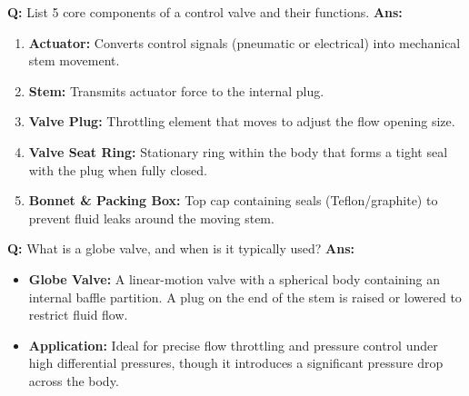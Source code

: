 \documentclass[10pt,a4paper,twocolumn]{article}
\begin{document}
\begin{tcolorbox}[
  colback=white,
  colframe=UnitColorThree,
  colbacktitle=gray!10!white,
  coltitle=black,
  fonttitle=\bfseries\sffamily\small,
  title={Unit III $\bullet$ Card 13: Control Valve Anatomy},
  boxrule=1.2pt,
  arc=2mm,
  outer arc=2mm,
  boxsep=1.5mm,
  top=1mm,
  bottom=1mm,
  left=1.5mm,
  right=1.5mm,
  before skip=2.5mm,
  after skip=2.5mm
]
\textbf{Q:} List 5 core components of a control valve and their functions.
\tcbline
\textbf{Ans:} \begin{enumerate}
  \item \textbf{Actuator:} Converts control signals (pneumatic or electrical) into mechanical stem movement.
  \item \textbf{Stem:} Transmits actuator force to the internal plug.
  \item \textbf{Valve Plug:} Throttling element that moves to adjust the flow opening size.
  \item \textbf{Valve Seat Ring:} Stationary ring within the body that forms a tight seal with the plug when fully closed.
  \item \textbf{Bonnet \& Packing Box:} Top cap containing seals (Teflon/graphite) to prevent fluid leaks around the moving stem.
\end{enumerate}
\end{tcolorbox}


\begin{tcolorbox}[
  colback=white,
  colframe=UnitColorThree,
  colbacktitle=gray!10!white,
  coltitle=black,
  fonttitle=\bfseries\sffamily\small,
  title={Unit III $\bullet$ Card 14: Globe Valves},
  boxrule=1.2pt,
  arc=2mm,
  outer arc=2mm,
  boxsep=1.5mm,
  top=1mm,
  bottom=1mm,
  left=1.5mm,
  right=1.5mm,
  before skip=2.5mm,
  after skip=2.5mm
]
\textbf{Q:} What is a globe valve, and when is it typically used?
\tcbline
\textbf{Ans:} \begin{itemize}
  \item   \textbf{Globe Valve:} A linear-motion valve with a spherical body containing an internal baffle partition. A plug on the end of the stem is raised or lowered to restrict fluid flow.
  \item   \textbf{Application:} Ideal for precise flow throttling and pressure control under high differential pressures, though it introduces a significant pressure drop across the body.
\end{itemize}
\end{tcolorbox}
\end{document}
